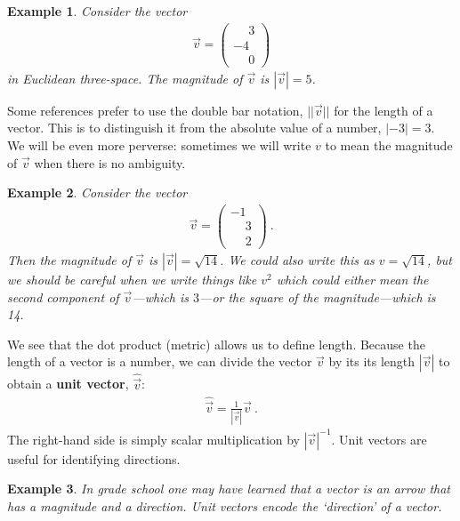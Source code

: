 \documentclass[12pt]{article}
\newtheorem{example}{Example}[section]
\begin{document}
\begin{example}
Consider the vector
\begin{align}
    \vec{v} = 
    \begin{pmatrix}
    \phantom{+}3\\-4\\\phantom{+}0    
    \end{pmatrix}
\end{align}
in Euclidean three-space. The magnitude of $\vec{v}$ is $|\vec{v}| = 5$.
\end{example}


Some references prefer to use the double bar notation, $||\vec{v}||$ for the length of a vector. This is to distinguish it from the absolute value of a number, $|-3| = 3$. We will be even more perverse: sometimes we will write $v$ to mean the magnitude of $\vec{v}$ when there is no ambiguity.

\begin{example}
Consider the vector
\begin{align}
    \vec{v} = 
    \begin{pmatrix}
    -1\\ \phantom{+}3\\ \phantom{+}2
    \end{pmatrix} \ .
\end{align}
Then the \emph{magnitude} of $\vec{v}$ is $|\vec{v}|=\sqrt{14}$. We could also write this as $v = \sqrt{14}$, but we should be careful when we write things like $v^2$ which could either mean the second component of $\vec{v}$---which is $3$---or the square of the magnitude---which is 14. 
\end{example}


We see that the dot product (metric) allows us to define length. Because the length of a vector is a number, we can divide the vector $\vec{v}$ by its its length $|\vec{v}|$ to obtain a \textbf{unit vector}, $\hat{\vec{v}}$:
\begin{align}
    \hat{\vec{v}} = \frac{1}{|\vec{v}|}\vec{v} \ .
    \label{eq:eg:v:340}
\end{align}
The right-hand side is simply scalar multiplication by $|\vec{v}|^{-1}$. Unit vectors are useful for identifying directions.

\begin{example}
In grade school one may have learned that a vector is an arrow that has a magnitude and a direction. Unit vectors encode the `direction' of a vector.
\end{example}
\end{document}
